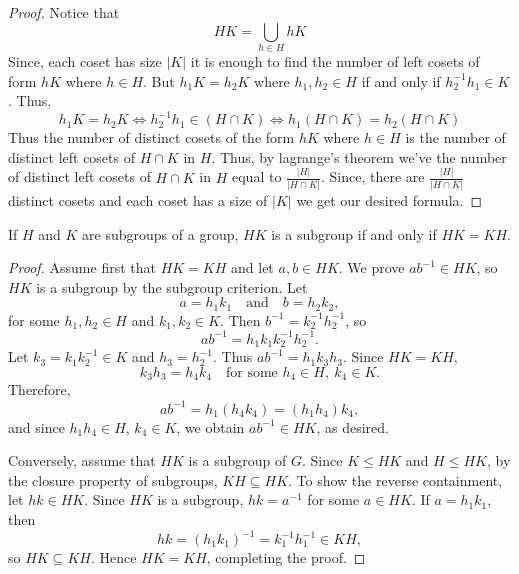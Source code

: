 \begin{proof}
    Notice that 
    \[ HK = \bigcup_{h \in H} hK \]
    Since, each coset has size $|K|$ it is enough to find the number of left cosets of form $hK$ where $h \in H$. But $h_1 K = h_2 K$ where
    $h_1,h_2 \in H$ if and only if $h_2^{-1}h_1 \in K$. Thus,
    \[ h_1 K = h_2 K \iff h_2^{-1}h_1 \in (H \cap K) \iff h_1 (H \cap K) = h_2 (H \cap K) \]
    Thus the number of distinct cosets of the form $hK$ where $h \in H$ is the number of distinct left cosets of $H \cap K$ in $H$.
    Thus, by lagrange's theorem we've the number of distinct left cosets of $H \cap K$ in $H$ equal to $\frac{|H|}{|H\cap K|}$.
    Since, there are $\frac{|H|}{|H\cap K|}$ distinct cosets and each coset has a size of $|K|$ we get our desired formula.
\end{proof}

\begin{proposition}
    If $H$ and $K$ are subgroups of a group, $HK$ is a subgroup if and only if $HK=KH$.
\end{proposition}

\begin{proof}
Assume first that \( HK = KH \) and let \( a, b \in HK \). We prove \( ab^{-1} \in HK \), so \( HK \) is a subgroup by the subgroup criterion.
Let
\[
a = h_1 k_1 \quad \text{and} \quad b = h_2 k_2,
\]
for some \( h_1, h_2 \in H \) and \( k_1, k_2 \in K \). Then \( b^{-1} = k_2^{-1} h_2^{-1} \), so 
\[
ab^{-1} = h_1 k_1 k_2^{-1} h_2^{-1}.
\]
Let \( k_3 = k_1 k_2^{-1} \in K \) and \( h_3 = h_2^{-1} \). Thus \( ab^{-1} = h_1 k_3 h_3 \). Since \( HK = KH \),
\[
k_3 h_3 = h_4 k_4 \quad \text{for some } h_4 \in H, \ k_4 \in K.
\]
Therefore,
\[
ab^{-1} = h_1 (h_4 k_4) = (h_1 h_4) k_4,
\]
and since \( h_1 h_4 \in H \), \( k_4 \in K \), we obtain \( ab^{-1} \in HK \), as desired.

Conversely, assume that \( HK \) is a subgroup of \( G \). Since \( K \leq HK \) and \( H \leq HK \), by the closure property of subgroups,
 \( KH \subseteq HK \). To show the reverse containment, let \( hk \in HK \). Since \( HK \) is a subgroup, \( hk = a^{-1} \) for some
  \( a \in HK \). If \( a = h_1 k_1 \), then
\[
hk = (h_1 k_1)^{-1} = k_1^{-1} h_1^{-1} \in KH,
\]
so \( HK \subseteq KH \). Hence \( HK = KH \), completing the proof.
    
\end{proof}